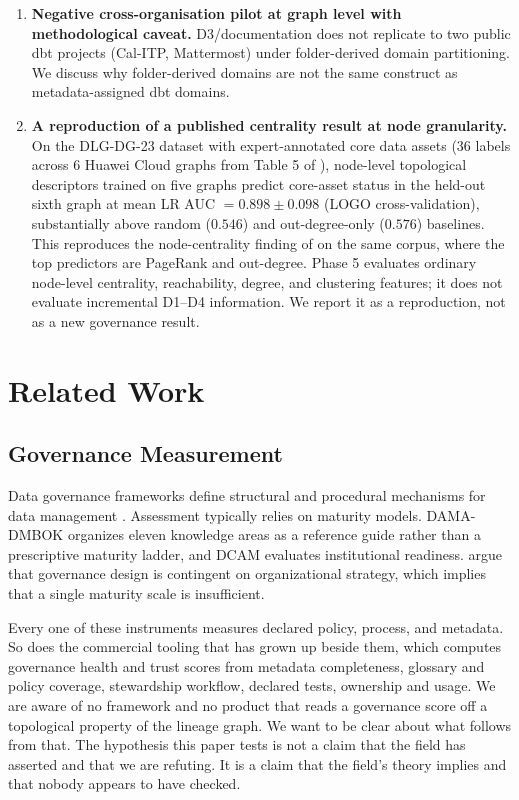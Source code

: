 \documentclass[11pt,a4paper]{article}
\begin{document}
\begin{enumerate}
  \item \textbf{Negative cross-organisation pilot at graph level with
        methodological caveat.} D3/documentation does not replicate to
        two public dbt projects (Cal-ITP, Mattermost) under
        folder-derived domain partitioning. We discuss why folder-derived
        domains are not the same construct as metadata-assigned dbt
        domains.

  \item \textbf{A reproduction of a published centrality result at node
        granularity.} On the DLG-DG-23 dataset with expert-annotated
        core data assets (36 labels across 6 Huawei Cloud graphs from
        Table 5 of \citep{chen2024dlgdg}), node-level topological
        descriptors trained on five graphs predict core-asset status in
        the held-out sixth graph at mean LR AUC $= 0.898 \pm 0.098$
        (LOGO cross-validation), substantially above random ($0.546$)
        and out-degree-only ($0.576$) baselines. This reproduces the
        node-centrality finding of \citet{chen2023centrality} on the
        same corpus, where the top predictors are PageRank and out-degree.
Phase
        5 evaluates ordinary node-level centrality, reachability, degree,
        and clustering features; it does not evaluate incremental D1--D4
        information. We report it as a reproduction, not as a new
        governance result.
\end{enumerate}

\section{Related Work}

\subsection{Governance Measurement}

Data governance frameworks define structural and procedural mechanisms
for data management \citep{khatri2010,abraham2019}. Assessment typically
relies on maturity models. DAMA-DMBOK \citep{dama2017} organizes eleven
knowledge areas as a reference guide rather than a prescriptive maturity
ladder, and DCAM evaluates institutional readiness. \citet{weber2009}
argue that governance design is contingent on organizational strategy,
which implies that a single maturity scale is insufficient.

Every one of these instruments measures declared policy, process, and
metadata. So does the commercial tooling that has grown up beside them,
which computes governance health and trust scores from metadata
completeness, glossary and policy coverage, stewardship workflow,
declared tests, ownership and usage. We are aware of no framework and no
product that reads a governance score off a topological property of the
lineage graph. We want to be clear about what follows from that. The
hypothesis this paper tests is not a claim that the field has asserted
and that we are refuting. It is a claim that the field's theory implies
and that nobody appears to have checked.
\end{document}
